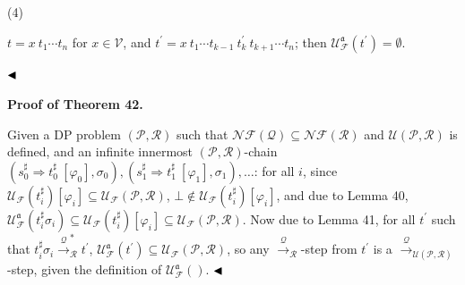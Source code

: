 \documentclass[10pt,a4paper]{amsart}
\begin{document}
 
 
\par\noindent  (4) 
 
$t={x}\ {{t}_{1}\cdots{t}_{n}}$ for $x\in\mathcal{V}$, and $t^{\prime}={{{x}\ {{t}_{1}\cdots{t}_{k-1}}}\ {t_{k}^{\prime}}}\ {{t}_{k+1}\cdots{t}_{n}}$; then $\mathcal{U}_{\mathcal{F}}^{\mathfrak{a}}(t^{\prime})=\emptyset$.\par
 
 
  
$\hfill\blacktriangleleft$\par
 

 
 
\par\medskip\noindent\textbf{Proof of Theorem 42.}\par
 
 
Given a DP problem $(\mathcal{P},\mathcal{R})$ such that $\mathcal{N}\!\mathcal{F}(\mathcal{Q})\subseteq\mathcal{N}\!\mathcal{F}(\mathcal{R})$ and $\mathcal{U}(\mathcal{P},\mathcal{R})$ is defined, and an infinite innermost $(\mathcal{P},\mathcal{R})$-chain $({s_{0}^{\sharp}}\Rightarrow{t_{0}^{\sharp}}\ [\varphi_{0}],\sigma_{0}),({s_{1}^{\sharp}}\Rightarrow{t_{1}^{\sharp}}\ [\varphi_{1}],\sigma_{1}),\ldots$: for all $i$, since $\mathcal{U}_{\mathcal{F}}(t_{i}^{\sharp})[\varphi_{i}]\subseteq\mathcal{U}_{\mathcal{F}}(\mathcal{P},\mathcal{R})$, $\bot\notin\mathcal{U}_{\mathcal{F}}(t_{i}^{\sharp})[\varphi_{i}]$, and due to Lemma 40, $\mathcal{U}_{\mathcal{F}}^{\mathfrak{a}}(t_{i}^{\sharp}\sigma_{i})\subseteq\mathcal{U}_{\mathcal{F}}(t_{i}^{\sharp})[\varphi_{i}]\subseteq\mathcal{U}_{\mathcal{F}}(\mathcal{P},\mathcal{R})$. Now due to Lemma 41, for all $t^{\prime}$ such that $t_{i}^{\sharp}\sigma_{i}\xrightarrow{\scriptscriptstyle\mathcal{Q}}_{\mathcal{R}}^{*}t^{\prime}$, $\mathcal{U}_{\mathcal{F}}^{\mathfrak{a}}(t^{\prime})\subseteq\mathcal{U}_{\mathcal{F}}(\mathcal{P},\mathcal{R})$, so any $\xrightarrow{\scriptscriptstyle\mathcal{Q}}_{\mathcal{R}}$-step from $t^{\prime}$ is a $\xrightarrow{\scriptscriptstyle\mathcal{Q}}_{\mathcal{U}(\mathcal{P},\mathcal{R})}$-step, given the definition of $\mathcal{U}_{\mathcal{F}}^{\mathfrak{a}}()$. $\hfill\blacktriangleleft$\par
 
 
\end{document}
